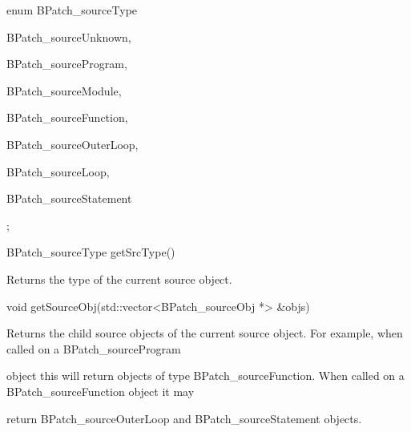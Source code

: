 {

enum BPatch_sourceType {



{

BPatch_sourceUnknown,



{

BPatch_sourceProgram,}



{

BPatch_sourceModule,



{

BPatch_sourceFunction,



{

BPatch_sourceOuterLoop,



{

BPatch_sourceLoop,



{

BPatch_sourceStatement };}





\bigskip



{

BPatch_sourceType getSrcType()}



{

Returns the type of the current source object.





\bigskip



{

void getSourceObj(std::vector<BPatch_sourceObj *> &objs)}



{

Returns the child source objects of the current source object. For example, when called on a BPatch_sourceProgram

object this will return objects of type BPatch_sourceFunction. When called on a BPatch_sourceFunction object it may

return BPatch_sourceOuterLoop and BPatch_sourceStatement objects.}





\bigskip



}}}}}}}
